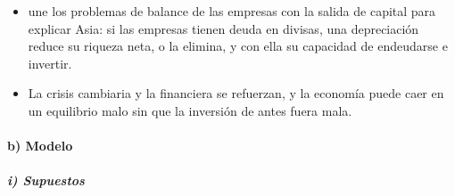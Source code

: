 \documentclass[11pt]{article}
\begin{document}
\begin{itemize}
\item \textcite{Krugman1999Balance} une los problemas de balance de las empresas con la salida de capital para explicar Asia: si las empresas tienen deuda en divisas, una depreciación reduce su riqueza neta, o la elimina, y con ella su capacidad de endeudarse e invertir\nocite{Krugman2001Next}.
\item La crisis cambiaria y la financiera se refuerzan, y la economía puede caer en un equilibrio malo sin que la inversión de antes fuera mala.
\end{itemize}

\paragraph{b) Modelo}

\subparagraph{i) Supuestos}
\end{document}
